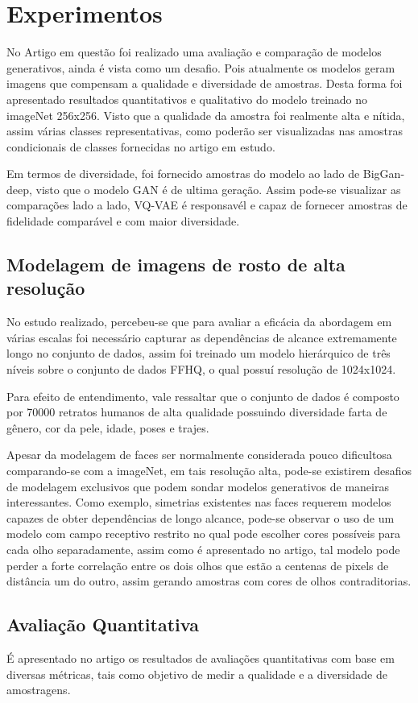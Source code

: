\documentclass[12pt]{article}
\begin{document}
\section{Experimentos}
No Artigo em questão foi realizado uma avaliação e comparação de modelos generativos, ainda é vista como um desafio. Pois atualmente os modelos geram imagens que compensam a qualidade e diversidade de amostras. Desta forma foi apresentado resultados quantitativos e qualitativo do modelo treinado no imageNet 256x256. Visto que a qualidade da amostra foi realmente alta e nítida, assim várias classes representativas, como poderão ser visualizadas nas amostras condicionais de classes fornecidas no artigo em estudo. 

Em termos de diversidade, foi fornecido amostras do modelo ao lado de BigGan-deep, visto que o modelo GAN é de ultima geração. Assim pode-se visualizar as comparações lado a lado, VQ-VAE é responsavél e capaz de fornecer amostras de fidelidade comparável e com maior diversidade.

\subsection{Modelagem de imagens de rosto de alta resolução}
No estudo realizado, percebeu-se que para avaliar a eficácia da abordagem em várias escalas foi necessário capturar as dependências de alcance extremamente longo no conjunto de dados, assim foi treinado um modelo hierárquico de três níveis sobre o conjunto de dados FFHQ, o qual possuí resolução de 1024x1024.

Para efeito de entendimento, vale ressaltar que o conjunto de dados é composto por 70000 retratos humanos de alta qualidade possuindo diversidade farta de gênero, cor da pele, idade, poses e trajes.

Apesar da modelagem de faces ser normalmente considerada pouco dificultosa comparando-se com a imageNet, em tais resolução alta, pode-se existirem desafios de modelagem exclusivos que podem sondar modelos generativos de maneiras interessantes. Como exemplo, simetrias existentes nas faces requerem modelos capazes de obter dependências de longo alcance, pode-se observar o uso de um modelo com campo receptivo restrito no qual pode escolher cores 
possíveis para cada olho separadamente, assim como é apresentado no artigo, tal modelo pode perder a forte correlação entre os dois olhos que estão a centenas de pixels de distância um do outro, assim gerando amostras com cores de olhos contraditorias.
\subsection{Avaliação Quantitativa}
    É apresentado no artigo os resultados de avaliações quantitativas com base em diversas métricas, tais como objetivo de medir a qualidade e a diversidade de amostragens.
\end{document}

